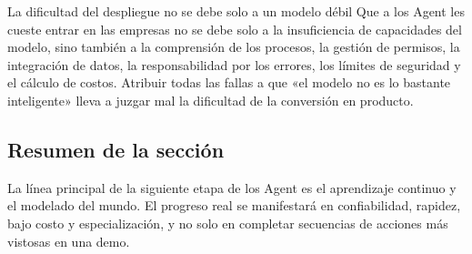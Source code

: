 \begin{warningbox}{La dificultad del despliegue no se debe solo a un modelo débil}
Que a los Agent les cueste entrar en las empresas no se debe solo a la insuficiencia de capacidades del modelo, sino también a la comprensión de los procesos, la gestión de permisos, la integración de datos, la responsabilidad por los errores, los límites de seguridad y el cálculo de costos. Atribuir todas las fallas a que «el modelo no es lo bastante inteligente» lleva a juzgar mal la dificultad de la conversión en producto.
\end{warningbox}

\subsection{Resumen de la sección}

La línea principal de la siguiente etapa de los Agent es el aprendizaje continuo y el modelado del mundo. El progreso real se manifestará en confiabilidad, rapidez, bajo costo y especialización, y no solo en completar secuencias de acciones más vistosas en una demo.
